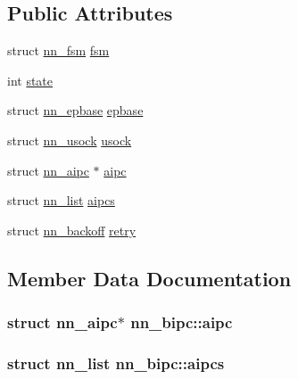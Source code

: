 \subsection*{Public Attributes}
\begin{DoxyCompactItemize}
\item 
struct \hyperlink{structnn__fsm}{nn\+\_\+fsm} \hyperlink{structnn__bipc_a64911e7ba9bc1358348c0eb7b3583d98}{fsm}
\item 
int \hyperlink{structnn__bipc_a8f0ba2783e54ed508e4c923e52d7550f}{state}
\item 
struct \hyperlink{structnn__epbase}{nn\+\_\+epbase} \hyperlink{structnn__bipc_a2b53bc22063b4ef9b9536d6ddf7d7091}{epbase}
\item 
struct \hyperlink{structnn__usock}{nn\+\_\+usock} \hyperlink{structnn__bipc_aebeda50dee0039b337dbf02cd9f30458}{usock}
\item 
struct \hyperlink{structnn__aipc}{nn\+\_\+aipc} $\ast$ \hyperlink{structnn__bipc_ad055a23304c4f0a9599828c11a8b1c43}{aipc}
\item 
struct \hyperlink{structnn__list}{nn\+\_\+list} \hyperlink{structnn__bipc_ae73477903d0ce3ceb4e655933d96feb7}{aipcs}
\item 
struct \hyperlink{structnn__backoff}{nn\+\_\+backoff} \hyperlink{structnn__bipc_a5b16dc9fb899848e419d82f925cf19bb}{retry}
\end{DoxyCompactItemize}


\subsection{Member Data Documentation}
\subsubsection[{aipc}]{\setlength{\rightskip}{0pt plus 5cm}struct {\bf nn\+\_\+aipc}$\ast$ nn\+\_\+bipc\+::aipc}\hypertarget{structnn__bipc_ad055a23304c4f0a9599828c11a8b1c43}{}\label{structnn__bipc_ad055a23304c4f0a9599828c11a8b1c43}
\subsubsection[{aipcs}]{\setlength{\rightskip}{0pt plus 5cm}struct {\bf nn\+\_\+list} nn\+\_\+bipc\+::aipcs}\hypertarget{structnn__bipc_ae73477903d0ce3ceb4e655933d96feb7}{}\label{structnn__bipc_ae73477903d0ce3ceb4e655933d96feb7}
